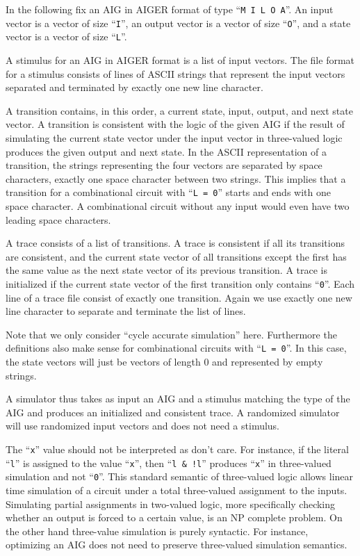 \documentclass[10pt]{llncs}
\begin{document}
  In the following fix an AIG in AIGER format of type ``\texttt{M I L O A}''.  An input
  vector is a vector of size ``\texttt{I}'', an output vector is a vector of size
  ``\texttt{O}'',
  and a state vector is a vector of size ``\texttt{L}''.

  A stimulus for an AIG in AIGER format is a list of input vectors.
  The file format for a stimulus consists of lines of ASCII strings that
  represent the input vectors separated and terminated by exactly one new
  line character.

  A transition contains, in this order, a current state, input, output, and
  next state vector.  A transition is consistent with the logic of the given
  AIG if the result of simulating the current state vector under the input
  vector in three-valued logic produces the given output and next state.  In
  the ASCII representation of a transition, the strings representing the
  four vectors are separated by space characters, exactly one space
  character between two strings.  This implies that a transition for a
  combinational circuit with ``\texttt{L = 0}'' starts and ends with one space
  character.  A combinational circuit without any input would even have two
  leading space characters.

  A trace consists of a list of transitions.  A trace is consistent if all
  its transitions are consistent, and the current state vector of all
  transitions except the first has the same value as the next state vector
  of its previous transition.  A trace is initialized if the current state
  vector of the first transition only contains ``\texttt{0}''.  Each line of a trace
  file consist of exactly one transition.  Again we use exactly one new line
  character to separate and terminate the list of lines.
  
  Note that we only consider ``cycle accurate simulation'' here.  Furthermore
  the definitions also make sense for combinational circuits with ``\texttt{L =
  0}''.
  In this case, the state vectors will just be vectors of length 0 and
  represented by empty strings.

  A simulator thus takes as input an AIG and a stimulus matching the type
  of the AIG and produces an initialized and consistent trace.  A randomized
  simulator will use randomized input vectors and does not need a stimulus.

  The ``\texttt{x}'' value should not be interpreted as don't care.  For instance, if
  the literal ``\texttt{l}'' is assigned to the value ``\texttt{x}'', then
  ``\texttt{l \& !l}'' produces ``\texttt{x}''
  in three-valued simulation and not ``\texttt{0}''.  This standard semantic of
  three-valued logic allows linear time simulation of a circuit under a
  total three-valued assignment to the inputs.  Simulating partial
  assignments in two-valued logic, more specifically checking whether an
  output is forced to a certain value, is an NP complete problem.  On the
  other hand three-value simulation is purely syntactic.  For instance,
  optimizing an AIG does not need to preserve three-valued simulation
  semantics.
\end{document}
